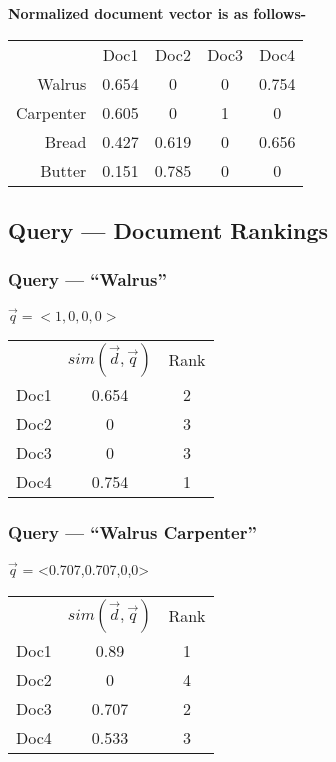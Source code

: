 \documentclass{article}
\begin{document}
\vspace{5mm}
\textbf{Normalized document vector is as follows-}

\begin{tabular}{r c c c c}
\multicolumn{1}{r}{}
 & \multicolumn{1}{c}{Doc1}
 & \multicolumn{1}{c}{Doc2}
 & \multicolumn{1}{c}{Doc3}
 & \multicolumn{1}{c}{Doc4} \\
\cline{2-5}
Walrus & 0.654 & 0 & 0 & 0.754 \\
\cline{2-5}
Carpenter & 0.605 & 0 & 1 & 0 \\
\cline{2-5}
Bread & 0.427 & 0.619 & 0 & 0.656 \\
\cline{2-5}
Butter & 0.151 & 0.785 & 0 & 0 \\
\cline{2-5}
\end{tabular}

\subsection{Query --- Document Rankings}

\subsubsection{Query --- ``Walrus''}
$\vec{q} = <1,0,0,0>$
  \begin{tabular}{r c c}
  \multicolumn{1}{r}{}
   & \multicolumn{1}{c}{$sim(\vec{d},\vec{q})$}
   & \multicolumn{1}{c}{Rank} \\
  \cline{2-3}
  Doc1 & 0.654 & 2 \\
  \cline{2-3}
  Doc2 & 0 & 3 \\
  \cline{2-3}
  Doc3 & 0 & 3 \\
  \cline{2-3}
  Doc4 & 0.754 & 1 \\
  \cline{2-3}
  \end{tabular}

\subsubsection{Query --- ``Walrus Carpenter''}
$\vec{q}$ = <0.707,0.707,0,0>
\begin{tabular}{r c c}
\multicolumn{1}{r}{}
 & \multicolumn{1}{c}{$sim(\vec{d},\vec{q})$}
 & \multicolumn{1}{c}{Rank} \\
\cline{2-3}
Doc1 & 0.89 & 1 \\
\cline{2-3}
Doc2 & 0 & 4 \\
\cline{2-3}
Doc3 & 0.707 & 2 \\
\cline{2-3}
Doc4 & 0.533 & 3 \\
\cline{2-3}
\end{tabular}
\end{document}
